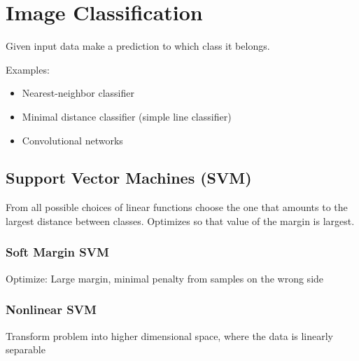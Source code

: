 \section{Image Classification}
Given input data make a prediction to which class it belongs.

Examples:
\begin{itemize}
    \item Nearest-neighbor classifier
    \item Minimal distance classifier (simple line classifier)
    \item Convolutional networks
\end{itemize}

\subsection{Support Vector Machines (SVM)}
From all possible choices of linear functions choose the one that amounts to the largest distance between classes.
Optimizes so that value of the margin is largest.

\subsubsection{Soft Margin SVM}
Optimize: Large margin, minimal penalty from samples on the wrong side

\subsubsection{Nonlinear SVM}
Transform problem into higher dimensional space, where the data is linearly separable

